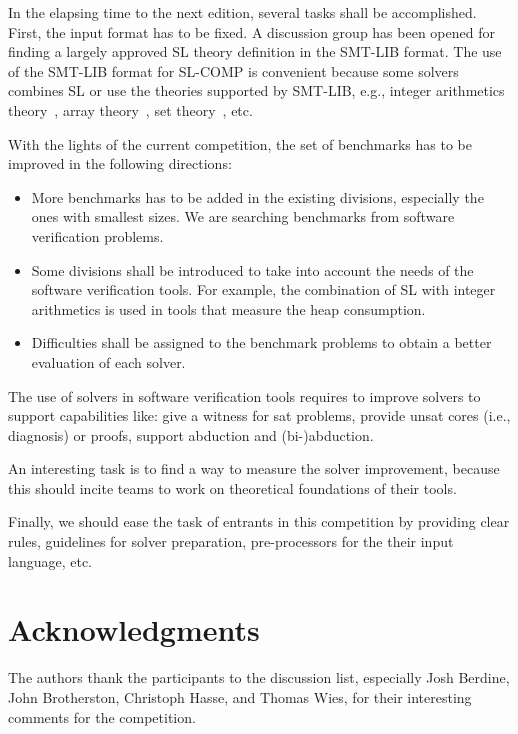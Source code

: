 \documentclass{llncs}
\begin{document}
In the elapsing time to the next edition, several tasks shall be accomplished.
First, the input format has to be fixed.
A discussion group has been opened for finding a largely approved SL theory definition in the SMT-LIB format.
The use of the SMT-LIB format for SL-COMP is convenient because some solvers combines SL  or use the theories supported by SMT-LIB, e.g., 
integer arithmetics theory~\cite{PerezR11}, array theory~\cite{BouajjaniDES12-vmcai}, set theory~\cite{PiskacWZ13}, etc.


With the lights of the current competition, the set of benchmarks has to be improved in the following directions:
\begin{itemize}
\item More benchmarks has to be added in the existing divisions, especially the ones with smallest sizes. 
We are searching benchmarks from software verification problems.

\item Some divisions shall be introduced to take into account the needs of the software verification tools. For example, the combination of SL with integer arithmetics is used in tools that measure the heap consumption.

\item Difficulties shall be assigned to the benchmark problems to obtain a better evaluation of each solver.
\end{itemize}

The use of solvers in software verification tools requires to improve solvers to support capabilities like:
give a witness for sat problems,
provide unsat cores (i.e., diagnosis) or proofs,
support abduction and (bi-)abduction.

An interesting task is to find a way to measure the solver improvement, because this should incite teams to work on theoretical foundations of their tools.
% 

Finally, we should ease the task of entrants in this competition by providing clear rules, guidelines for solver preparation, pre-processors for the their input language, etc.



\section*{Acknowledgments}

The authors thank the participants to the discussion list, especially 
Josh Berdine, John Brotherston, Christoph Hasse, and Thomas Wies, 
for their interesting comments for the competition.





\end{document}
